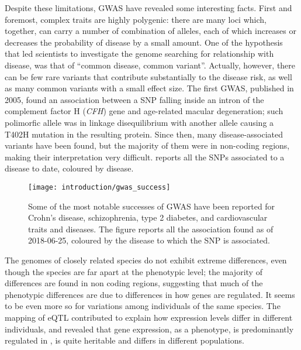 \documentclass[../main.tex]{subfiles}
\begin{document}
Despite these limitations, GWAS have revealed some interesting facts. 
First and foremost, complex traits are highly 
polygenic\autocite{Visscher2017}: there are many loci which, together, 
can carry a number of combination of alleles, each of which increases or 
decreases the probability of disease by a small amount. One of the 
hypothesis that led scientists to investigate the genome searching for 
relationship with disease, was that of \enquote{common disease, common 
variant}. Actually, however, there can be few rare variants that 
contribute substantially to the disease risk, as well as many common 
variants with a small effect size. The first GWAS, published in 2005, 
found an association between a SNP falling inside an intron of the 
complement factor H (\textit{CFH}) gene and age-related macular 
degeneration\autocite{Klein2005}; such polimorfic allele was in linkage 
disequilibrium with another allele causing a T402H mutation in the 
resulting protein. Since then, many disease-associated variants have 
been found, but the majority of them were in non-coding regions, making 
their interpretation very difficult.  reports all 
the SNPs associated to a disease to date, coloured by disease.

\begin{figure}
	\centering
	\texttt{[image: introduction/gwas\_success]}
	\caption{Some of the most notable successes of GWAS have been 
reported for Crohn’s disease, schizophrenia, type 2 diabetes, and 
cardiovascular traits and diseases. The figure reports all the 
association found as of 2018-06-25, coloured by the disease to which the 
SNP is associated.}
\end{figure}

The genomes of closely related species do not exhibit extreme 
differences, even though the species are far apart at the phenotypic 
level; the majority of differences are found in non coding 
regions, 
suggesting that much of the phenotypic differences are due to 
differences in how genes are regulated. It seems to be even more so for 
variations among individuals of the same species. The mapping of eQTL 
contributed to explain how expression levels differ in different 
individuals, and revealed that gene expression, as a phenotype, is 
predominantly regulated in \cis, is quite heritable and differs in 
different populations\autocite{Gilad2008}.
\end{document}
